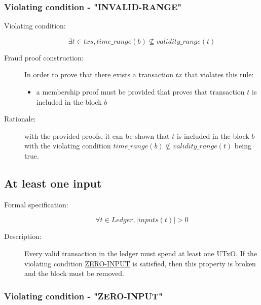 \documentclass[../main.tex]{subfiles}
\begin{document}
\subsubsection{Violating condition - "INVALID-RANGE"}
\label{sec:INVALID-RANGE}

\begin{description}

\item[Violating condition:]
\begin{equation*}
    \exists t \in txs, time\_range(b) \nsubseteq validity\_range(t)
\end{equation*}

\item[Fraud proof construction:] In order to prove that there exists a transaction $tx$ that violates this rule:
\begin{itemize}
    \item a membership proof must be provided that proves that transaction $t$ is included in the block $b$
\end{itemize}

\item[Rationale:] with the provided proofs, it can be shown that $t$ is included in the block $b$ with the violating condition $time\_range(b) \nsubseteq validity\_range(t)$ being true.

\end{description}

\subsection{At least one input}

\begin{description}

\item[Formal specification:]
\begin{equation*}
    \forall t \in Ledger, |inputs(t)| > 0
\end{equation*}

\item[Description:] Every valid transaction in the ledger must spend at least one UTxO.
  If the violating condition \hyperref[sec:ZERO-INPUT]{ZERO-INPUT} is satisfied, then this property is broken and the block must be removed.

\end{description}

\subsubsection{Violating condition - "ZERO-INPUT"}
\label{sec:ZERO-INPUT}
\end{document}
